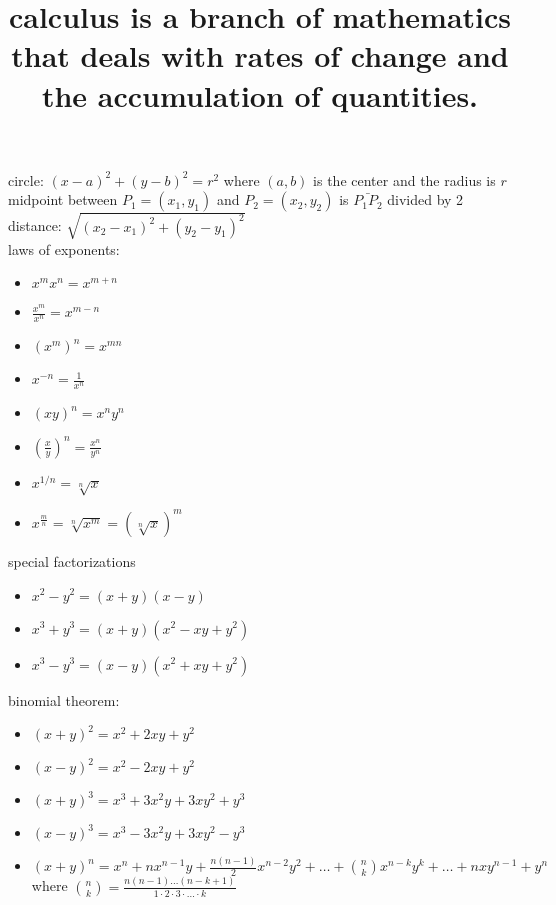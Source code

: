 \documentclass{article}
\begin{document}
\title{calculus is a branch of mathematics that deals with rates of change and the accumulation of quantities.}
\maketitle

circle: $(x-a)^2 + (y-b)^2 = r^2$ where $(a, b)$ is the center and the radius is $r$\\

midpoint between $P_1 = (x_1, y_1)$ and $P_2 = (x_2, y_2)$ is $\bar{P_{1}P_2}$ divided by 2\\

distance: $\sqrt{(x_2 - x_1)^2 + (y_2 - y_1)^2}$\\

laws of exponents: 

	\begin{itemize}
		\item $x^mx^n = x^{m+n}$
		\item $\frac{x^m}{x^n} = x^{m-n}$
		\item $(x^m)^n = x^{mn}$
		\item $x^{-n} = \frac{1}{x^n}$
		\item $(xy)^n = x^ny^n$
		\item $(\frac{x}{y})^n = \frac{x^n}{y^n}$
		\item $x^{1/n} = \sqrt[n]{x}$
		\item $x^{\frac{m}{n}} = \sqrt[n]{x^m} = (\sqrt[n]{x})^m$
	\end{itemize}

special factorizations

	\begin{itemize}
		\item $x^2 - y^2 = (x + y)(x - y)$
		\item $x^3 + y^3 = (x + y)(x^2 - xy + y^2)$
		\item $x^3 - y^3 = (x - y)(x^2 + xy + y^2)$
	\end{itemize}

binomial theorem:

	\begin{itemize}
		\item $(x + y)^2 = x^2 + 2xy + y^2$
		\item $(x - y)^2 = x^2 - 2xy + y^2$
		\item $(x + y)^3 = x^3 + 3x^2y + 3xy^2 + y^3$
		\item $(x - y)^3 = x^3 - 3x^2y + 3xy^2 - y^3$
		\item $(x + y)^n = x^n + nx^{n-1}y + \frac{n(n-1)}{2}x^{n-2}y^2 + \ldots + \binom{n}{k}x^{n-k}y^k + \dots + nxy^{n-1} + y^n$
			where $\binom{n}{k} = \frac{n(n-1) \dots (n-k+1)}{1 \cdot 2 \cdot 3 \cdot \ldots \cdot k}$
	\end{itemize}
\end{document}
